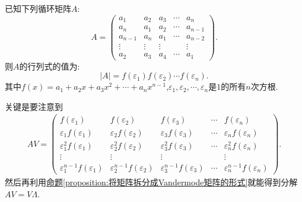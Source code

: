 \documentclass[../../main.tex]{subfiles}%
\begin{document}
\begin{proposition}\label{proposition:循环行列式计算公式}
已知下列循环矩阵\(A\):
\[
A = 
\begin{pmatrix}
a_1 & a_2 & a_3 & \cdots & a_n\\
a_n & a_1 & a_2 & \cdots & a_{n - 1}\\
a_{n - 1} & a_n & a_1 & \cdots & a_{n - 2}\\
\vdots & \vdots & \vdots & & \vdots\\
a_2 & a_3 & a_4 & \cdots & a_1
\end{pmatrix}.
\]
则\(A\)的行列式的值为:
\[
|A| = f(\varepsilon_1)f(\varepsilon_2)\cdots f(\varepsilon_n).
\]
其中\(f(x)=a_1 + a_2x + a_3x^2+\cdots+a_nx^{n - 1}\),\(\varepsilon_1,\varepsilon_2,\cdots,\varepsilon_n\)是\(1\)的所有\(n\)次方根.
\end{proposition}
\begin{note}
关键是要注意到
\begin{align*}
AV = 
\begin{pmatrix}
f(\varepsilon_1) & f(\varepsilon_2) & f(\varepsilon_3) & \cdots & f(\varepsilon_n)\\
\varepsilon_1f(\varepsilon_1) & \varepsilon_2f(\varepsilon_2) & \varepsilon_3f(\varepsilon_3) & \cdots & \varepsilon_nf(\varepsilon_n)\\
\varepsilon_1^2f(\varepsilon_1) & \varepsilon_2^2f(\varepsilon_2) & \varepsilon_3^2f(\varepsilon_3) & \cdots & \varepsilon_n^2f(\varepsilon_n)\\
\vdots & \vdots & \vdots & & \vdots\\
\varepsilon_1^{n - 1}f(\varepsilon_1) & \varepsilon_2^{n - 1}f(\varepsilon_2) & \varepsilon_3^{n - 1}f(\varepsilon_3) & \cdots & \varepsilon_n^{n - 1}f(\varepsilon_n)
\end{pmatrix}.
\end{align*}
然后再利用\hyperref[proposition:将矩阵拆分成Vandermode矩阵的形式]{命题\ref{proposition:将矩阵拆分成Vandermode矩阵的形式}}就能得到分解$AV = V\Lambda$.
\end{note}
\end{document}
